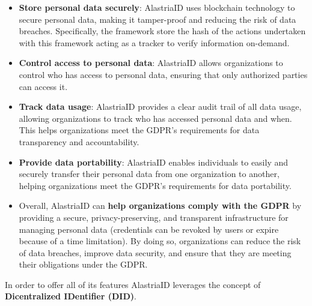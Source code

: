 \documentclass[target=mst,aauheader=]{thud}
\begin{document}
\begin{itemize}

    \item \textbf{Store personal data securely}: AlastriaID uses blockchain technology to secure personal data, making it tamper-proof and reducing the risk of data breaches. Specifically, the framework store the hash of the actions undertaken with this framework acting as a tracker to verify information on-demand.
    \item \textbf{Control access to personal data}: AlastriaID allows organizations to control who has access to personal data, ensuring that only authorized parties can access it.
    \item \textbf{Track data usage}: AlastriaID provides a clear audit trail of all data usage, allowing organizations to track who has accessed personal data and when. This helps organizations meet the GDPR's requirements for data transparency and accountability.
    \item \textbf{Provide data portability}: AlastriaID enables individuals to easily and securely transfer their personal data from one organization to another, helping organizations meet the GDPR's requirements for data portability.
    \item Overall, AlastriaID can \textbf{help organizations comply with the GDPR} by providing a secure, privacy-preserving, and transparent infrastructure for managing personal data (credentials can be revoked by users or expire because of a time limitation). By doing so, organizations can reduce the risk of data breaches, improve data security, and ensure that they are meeting their obligations under the GDPR.

\end{itemize}

In order to offer all of its features AlastriaID leverages the concept of \textbf{Dicentralized IDentifier (DID\cite{DID})}.
\end{document}
